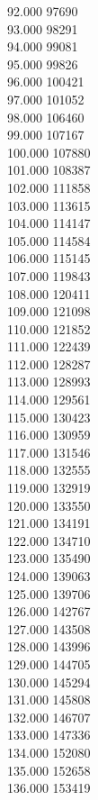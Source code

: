 { 92.000	97690 \\
 93.000	98291 \\
 94.000	99081 \\
 95.000	99826 \\
 96.000	100421 \\
 97.000	101052 \\
 98.000	106460 \\
 99.000	107167 \\
 100.000	107880 \\
 101.000	108387 \\
 102.000	111858 \\
 103.000	113615 \\
 104.000	114147 \\
 105.000	114584 \\
 106.000	115145 \\
 107.000	119843 \\
 108.000	120411 \\
 109.000	121098 \\
 110.000	121852 \\
 111.000	122439 \\
 112.000	128287 \\
 113.000	128993 \\
 114.000	129561 \\
 115.000	130423 \\
 116.000	130959 \\
 117.000	131546 \\
 118.000	132555 \\
 119.000	132919 \\
 120.000	133550 \\
 121.000	134191 \\
 122.000	134710 \\
 123.000	135490 \\
 124.000	139063 \\
 125.000	139706 \\
 126.000	142767 \\
 127.000	143508 \\
 128.000	143996 \\
 129.000	144705 \\
 130.000	145294 \\
 131.000	145808 \\
 132.000	146707 \\
 133.000	147336 \\
 134.000	152080 \\
 135.000	152658 \\
 136.000	153419 \\
}
